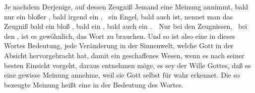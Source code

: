 \begin{aufza}
\item Je nachdem Derjenige, auf dessen Zeugniß Jemand eine Meinung annimmt, bald nur ein bloßer , bald irgend ein , \zB\ ein Engel, bald auch  ist, nennet man das Zeugniß bald ein bloß , bald ein , bald auch ein .~\ Nur bei den  Zeugnissen, \zB\ bei den , ist es gewöhnlich, das Wort  zu brauchen. Und so ist also eine  in dieses Wortes  Bedeutung, jede Veränderung in der Sinnenwelt, welche Gott in der Absicht hervorgebracht hat, damit ein geschaffenes Wesen, wenn es nach seiner besten Einsicht vorgeht, daraus entnehmen möge, es sey der Wille Gottes, daß es eine gewisse Meinung annehme, weil sie Gott selbst für wahr erkennet. Die so bezeugte Meinung heißt eine  in der  Bedeutung des Wortes.

\end{aufza}
